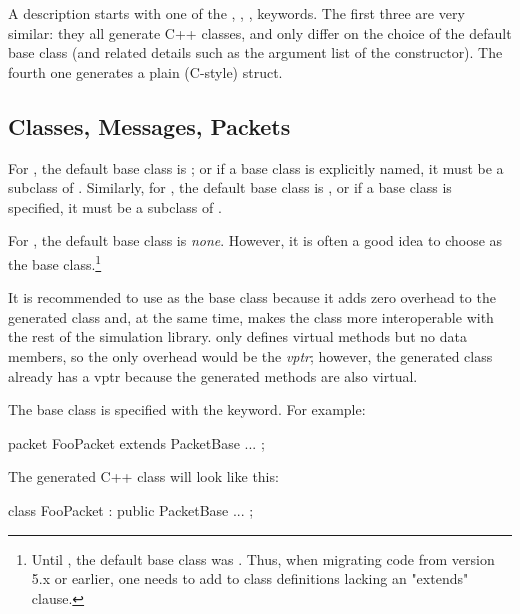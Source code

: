 A description starts with one of the , ,
,  keywords. The first three are very
similar: they all generate C++ classes, and only differ on the
choice of the default base class (and related details such as the argument list of the
constructor). The fourth one generates a plain (C-style) struct.


\subsection{Classes, Messages, Packets}
\label{sec:msg-defs:classes-messages-packets}
\label{sec:msg-defs:defining-classes}
\label{sec:msg-defs:messages-and-packets}
\label{sec:msg-defs:defining-messages-and-packets}

For , the default base class is ; or if a base
class is explicitly named, it must be a subclass of . Similarly,
for , the default base class is , or if a
base class is specified, it must be a subclass of .

For , the default base class is \textit{none}. However, it is often a
good idea to choose  as the base class.\footnote{Until , the default base class was . Thus, when migrating code from
version 5.x or earlier, one needs to add  to class
definitions lacking an "extends" clause.}

\begin{note}
  It is recommended to use  as the base class because it adds zero
  overhead to the generated class and, at the same time, makes the class more
  interoperable with the rest of the simulation library. 
  only defines virtual methods but no data members, so the only overhead would
  be the \textit{vptr}; however, the generated class already has a vptr because
  the generated methods are also virtual.
\end{note}

The base class is specified with the  keyword. For example:

\begin{msg}
packet FooPacket extends PacketBase
{
    ...
};
\end{msg}

The generated C++ class will look like this:

\begin{cpp}
class FooPacket : public PacketBase {
    ...
};
\end{cpp}

